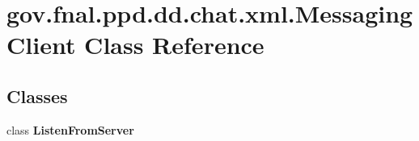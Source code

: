 \hypertarget{classgov_1_1fnal_1_1ppd_1_1dd_1_1chat_1_1xml_1_1MessagingClient}{\section{gov.\-fnal.\-ppd.\-dd.\-chat.\-xml.\-Messaging\-Client Class Reference}
\label{classgov_1_1fnal_1_1ppd_1_1dd_1_1chat_1_1xml_1_1MessagingClient}
}
\subsection*{Classes}
\begin{DoxyCompactItemize}
\item 
class {\bfseries Listen\-From\-Server}
\end{DoxyCompactItemize}
